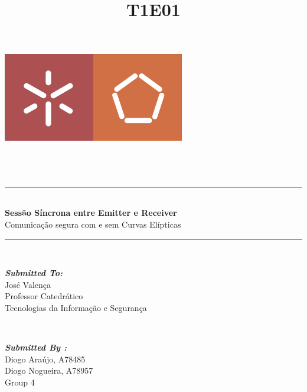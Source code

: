 \documentclass[12pt]{report}
\title{T1E01}
\begin{document}
    
\begin{titlepage}
	\centering
    \vspace*{0.5 cm}
    \includegraphics[scale = 0.50]{logo.png}\\[1.0 cm]	%
	\\[0.1 cm]
	\\[3.0 cm]
	\\[0.5 cm]				%
	\rule{\linewidth}{0.2 mm} \\[0.4 cm]
	{ \huge \bfseries Sessão Síncrona entre Emitter e Receiver}\\[0.3 cm]
	{ \LARGE Comunicação segura com e sem Curvas Elípticas }
	\rule{\linewidth}{0.2 mm} \\[3.5 cm]
	
	\begin{minipage}{0.4\textwidth}
		\begin{flushleft} \large
			\emph{\textbf{Submitted To:}}\\
			José Valença\\
            Professor Catedrático\\
             Tecnologias da Informação e Segurança\\
			\end{flushleft}
			\end{minipage}~
			\begin{minipage}{0.4\textwidth}
            
			\begin{flushright} \large
			\emph{\textbf{Submitted By :}} \\
			Diogo Araújo, A78485\\
		Diogo Nogueira, A78957\\
            Group 4\\
		\end{flushright}
        
	\end{minipage}\\[2 cm]

	
\end{titlepage}
    
\end{document}
